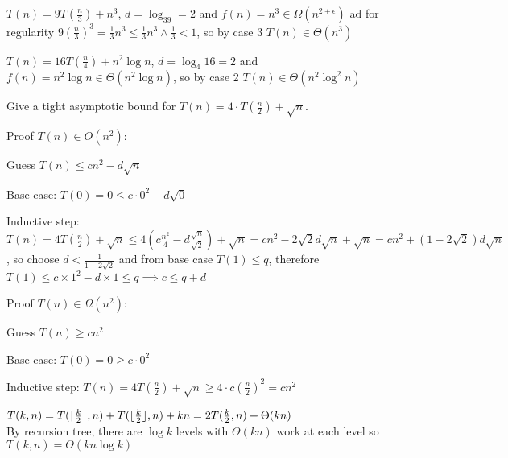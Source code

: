 \documentclass[12pt, a4paper]{article}
\begin{document}
\begin{enumerate}[Q\arabic*).]
  \item $T(n) = 9T(\frac{n}{3}) + n^3$, $d = \log_39 = 2$ and $f(n) = n^3 \in \Omega(n^{2+\epsilon})$ ad for regularity $9(\frac{n}{3})^3 = \frac{1}{3}n^3 \leq \frac{1}{3}n^3 \land \frac{1}{3}<1$, so by case 3 $T(n) \in \Theta(n^3)$

  \item $T(n) = 16T(\frac{n}{4}) + n^2\log n$, $d = \log_4{16} = 2$ and $f(n) = n^2\log n \in \Theta(n^2\log n)$, so by case 2 $T(n) \in \Theta(n^2\log^2n)$

  \item Give a tight asymptotic bound for $T(n) = 4\cdot T(\frac{n}{2}) + \sqrt n$.
    \begin{enumproof}
    \item Proof $T(n)\in O(n^2)$:
      \begin{enumproof}
      \item Guess $T(n) \leq cn^2 -d\sqrt n$ 
      \item Base case: $T(0) = 0 \leq c \cdot 0^2 - d \sqrt{0}$
      \item Inductive step: $T(n) = 4T(\frac{n}{2}) + \sqrt n \leq 4(c \frac{n^2}{4} - d \frac{\sqrt n}{\sqrt 2}) + \sqrt n = cn^2-2\sqrt 2 d\sqrt n + \sqrt n = cn^2 + (1-2\sqrt 2)d\sqrt n$, so choose $d <\frac{1}{1-2\sqrt{2}}$ and from base case $T(1) \leq q$, therefore $T(1) \leq c \times 1^2 - d\times 1 \leq q \implies c \leq q + d$
      \end{enumproof}
    \item Proof $T(n)\in \Omega(n^2)$:
      \begin{enumproof}
      \item Guess $T(n) \geq cn^2$
      \item Base case: $T(0) = 0 \geq c \cdot 0^2$
      \item Inductive step: $T(n) = 4T(\frac{n}{2}) + \sqrt n \geq 4\cdot c(\frac{n}{2})^2 = cn^2$
      \end{enumproof}
    \end{enumproof}

  \item $T(k, n) = T(\lceil \frac{k}{2} \rceil, n) + T(\lfloor \frac{k}{2} \rfloor, n) + kn = 2T(\frac{k}{2}, n) + \Theta(kn)$\\
    By recursion tree, there are $\log k$ levels with $\Theta(kn)$ work at each level so $T(k, n) = \Theta(kn\log k)$
\end{enumerate}
\pagebreak
\end{document}
